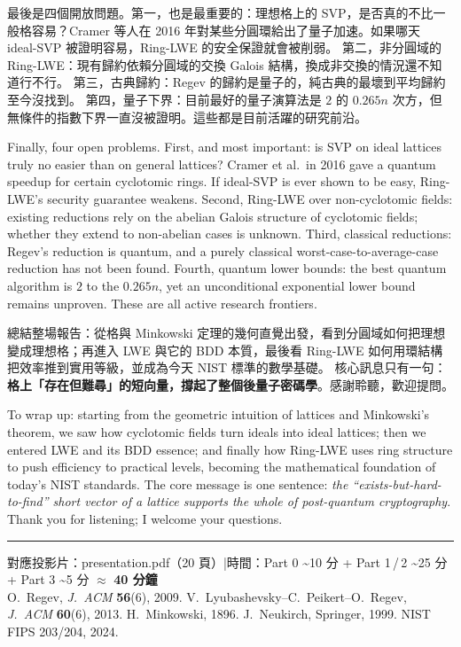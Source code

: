 \documentclass[10.5pt, a4paper]{article}
\newcommand{\slide}[2]{%
  \vspace{2pt}%
  \noindent{\small\bfseries\color{accent} ◆ 第 #1 頁\;|\;#2}\par\vspace{1pt}%
}
\newenvironment{zh}{%
  \begin{tcolorbox}[colback=zhfill, colframe=accent!45, breakable,
    left=5pt, right=5pt, top=2.5pt, bottom=2.5pt, boxrule=0.4pt,
    title={\footnotesize\bfseries 中文口語}, fonttitle=\color{white},
    coltitle=white, colbacktitle=accent]\small
}{\end{tcolorbox}\vspace{-1pt}}
\newenvironment{en}{%
  \begin{tcolorbox}[colback=enfill, colframe=engreen!45, breakable,
    left=5pt, right=5pt, top=2.5pt, bottom=2.5pt, boxrule=0.4pt,
    title={\footnotesize\bfseries English Script}, fonttitle=\color{white},
    coltitle=white, colbacktitle=engreen]\small\itshape
}{\end{tcolorbox}\vspace{1pt}}
\begin{document}
\slide{19}{開放問題}
\begin{zh}
最後是四個開放問題。第一，也是最重要的：理想格上的 SVP，是否真的不比一般格容易？Cramer 等人在 2016 年對某些分圓環給出了量子加速。如果哪天 ideal-SVP 被證明容易，Ring-LWE 的安全保證就會被削弱。
第二，非分圓域的 Ring-LWE：現有歸約依賴分圓域的交換 Galois 結構，換成非交換的情況還不知道行不行。
第三，古典歸約：Regev 的歸約是量子的，純古典的最壞到平均歸約至今沒找到。
第四，量子下界：目前最好的量子演算法是 $2$ 的 $0.265n$ 次方，但無條件的指數下界一直沒被證明。這些都是目前活躍的研究前沿。
\end{zh}
\begin{en}
Finally, four open problems. First, and most important: is SVP on ideal lattices truly no easier than on general lattices? Cramer et al.\ in 2016 gave a quantum speedup for certain cyclotomic rings. If ideal-SVP is ever shown to be easy, Ring-LWE's security guarantee weakens.
Second, Ring-LWE over non-cyclotomic fields: existing reductions rely on the abelian Galois structure of cyclotomic fields; whether they extend to non-abelian cases is unknown.
Third, classical reductions: Regev's reduction is quantum, and a purely classical worst-case-to-average-case reduction has not been found.
Fourth, quantum lower bounds: the best quantum algorithm is $2$ to the $0.265n$, yet an unconditional exponential lower bound remains unproven. These are all active research frontiers.
\end{en}

\slide{20}{結尾與致謝}
\begin{zh}
總結整場報告：從格與 Minkowski 定理的幾何直覺出發，看到分圓域如何把理想變成理想格；再進入 LWE 與它的 BDD 本質，最後看 Ring-LWE 如何用環結構把效率推到實用等級，並成為今天 NIST 標準的數學基礎。
核心訊息只有一句：\textbf{格上「存在但難尋」的短向量，撐起了整個後量子密碼學}。感謝聆聽，歡迎提問。
\end{zh}
\begin{en}
To wrap up: starting from the geometric intuition of lattices and Minkowski's theorem, we saw how cyclotomic fields turn ideals into ideal lattices; then we entered LWE and its BDD essence; and finally how Ring-LWE uses ring structure to push efficiency to practical levels, becoming the mathematical foundation of today's NIST standards.
The core message is one sentence: \emph{the ``exists-but-hard-to-find'' short vector of a lattice supports the whole of post-quantum cryptography}. Thank you for listening; I welcome your questions.
\end{en}

\vspace{4pt}
\noindent\rule{\linewidth}{0.4pt}
\begin{center}\small\color{gray}
  對應投影片：presentation.pdf（20 頁）\quad|\quad 時間：Part 0 \textasciitilde10 分 + Part 1\,/\,2 \textasciitilde25 分 + Part 3 \textasciitilde5 分 $\approx$ \textbf{40 分鐘}\\[2pt]
  O.\ Regev, \textit{J.\ ACM} \textbf{56}(6), 2009.\;
  V.\ Lyubashevsky--C.\ Peikert--O.\ Regev, \textit{J.\ ACM} \textbf{60}(6), 2013.\;
  H.\ Minkowski, 1896.\; J.\ Neukirch, Springer, 1999.\; NIST FIPS 203/204, 2024.
\end{center}
\end{document}
